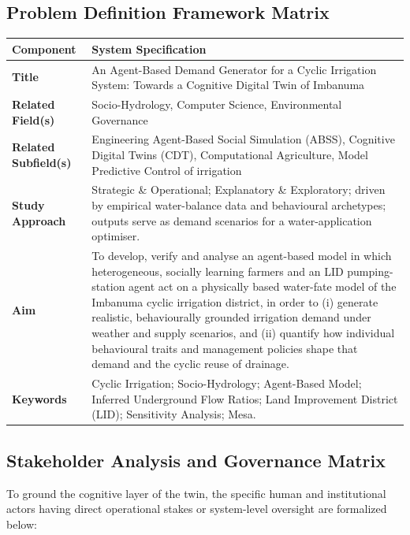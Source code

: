 \documentclass{article}
\begin{document}
\subsection{Problem Definition Framework Matrix}
\begin{changed}
\centering
\small
{}
\begin{tabular}{|p{3.5cm}|p{12.2cm}|}
    \hline
    \rowcolor[HTML]{F8F319}
    \textbf{Component} & \textbf{System Specification} \\ \hline
    \textbf{Title} & An Agent-Based Demand Generator for a Cyclic Irrigation System: Towards a Cognitive Digital Twin of Imbanuma \\ \hline
    \textbf{Related Field(s)} & Socio-Hydrology, Computer Science, Environmental Governance \\ \hline
    \textbf{Related Subfield(s)} & Engineering Agent-Based Social Simulation (ABSS), Cognitive Digital Twins (CDT), Computational Agriculture, Model Predictive Control of irrigation \\ \hline
    \textbf{Study Approach} & Strategic \& Operational; Explanatory \& Exploratory; driven by empirical water-balance data \citep{Okura2025WaterBalance} and behavioural archetypes; outputs serve as demand scenarios for a water-application optimiser. \\ \hline
    \textbf{Aim} & To develop, verify and analyse an agent-based model in which heterogeneous, socially learning farmers and an LID pumping-station agent act on a physically based water-fate model of the Imbanuma cyclic irrigation district, in order to (i) generate realistic, behaviourally grounded irrigation demand under weather and supply scenarios, and (ii) quantify how individual behavioural traits and management policies shape that demand and the cyclic reuse of drainage. \\ \hline
    \textbf{Keywords} & Cyclic Irrigation; Socio-Hydrology; Agent-Based Model; Inferred Underground Flow Ratios; Land Improvement District (LID); Sensitivity Analysis; Mesa. \\ \hline
\end{tabular}
\label{tab:eabss_step1_metadata}
\end{changed}

\subsection{Stakeholder Analysis and Governance Matrix}
To ground the cognitive layer of the twin, the specific human and institutional actors having direct operational stakes or system-level oversight are formalized below:
\end{document}
